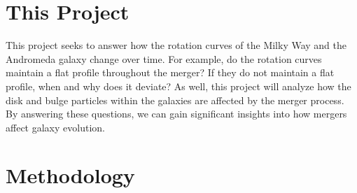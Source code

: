 \documentclass[twocolumn,linenumbers,trackchanges]{aastex7}
\begin{document}
\section{This Project}
This project seeks to answer how the rotation curves of the Milky Way and the Andromeda galaxy change over time.
For example, do the rotation curves maintain a flat profile throughout the merger?
If they do not maintain a flat profile, when and why does it deviate?
As well, this project will analyze how the disk and bulge particles within the galaxies are affected by the merger process. 
By answering these questions, we can gain significant insights into how mergers affect galaxy evolution.



\section{Methodology}



\end{document}

